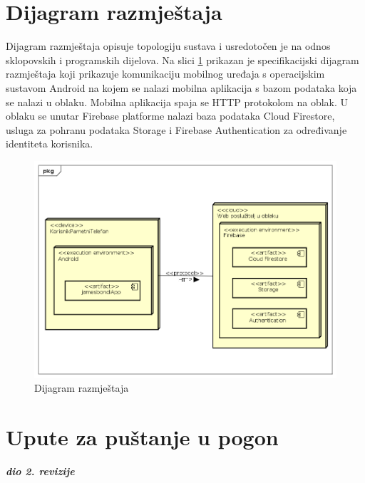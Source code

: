 			\eject 
		
		
		\section{Dijagram razmještaja}
			
			Dijagram razmještaja opisuje topologiju sustava i usredotočen je na odnos sklopovskih i programskih dijelova. Na slici \ref{fig:Dijagram_razmjestaja} prikazan je specifikacijski dijagram razmještaja koji prikazuje komunikaciju mobilnog uređaja s operacijskim sustavom Android na kojem se nalazi mobilna aplikacija s bazom podataka koja se nalazi u oblaku. Mobilna aplikacija spaja se HTTP protokolom na oblak. U oblaku se unutar Firebase platforme nalazi baza podataka Cloud Firestore, usluga za pohranu podataka Storage i Firebase Authentication za određivanje identiteta korisnika.
			
			
			\begin{figure}[h]
				\includegraphics[scale=0.6]{dijagrami/Dijagram_razmjestaja.PNG}
				\centering
				\caption{Dijagram razmještaja}
				\label{fig:Dijagram_razmjestaja}
			\end{figure}
		
			
			\eject 
		
		\section{Upute za puštanje u pogon}
		
			\textbf{\textit{dio 2. revizije}}\\
		

